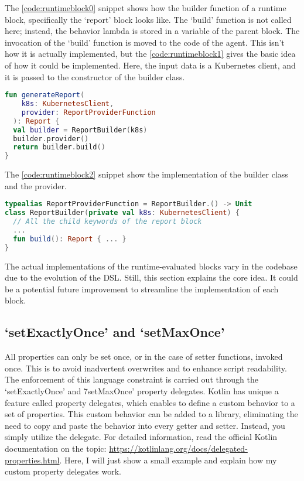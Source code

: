 The \ref{code:runtimeblock0} snippet shows how the builder function of a runtime block, specifically the `report' block looks like. The `build' function is not called here; instead, the behavior lambda is stored in a variable of the parent block. The invocation of the `build' function is moved to the code of the agent. This isn't how it is actually implemented, but the \ref{code:runtimeblock1} gives the basic idea of how it could be implemented. Here, the input data is a Kubernetes client, and it is passed to the constructor of the builder class.

\begin{minipage}{\linewidth}
\begin{lstlisting}[caption={Build a report},language=Kotlin,label=code:runtimeblock1]
fun generateReport(
    k8s: KubernetesClient, 
    provider: ReportProviderFunction
  ): Report {
  val builder = ReportBuilder(k8s)
  builder.provider()
  return builder.build()
}
\end{lstlisting}
\end{minipage}

The \ref{code:runtimeblock2} snippet show the implementation of the builder class and the provider.

\begin{minipage}{\linewidth}
\begin{lstlisting}[caption={Report builder class and provider},language=Kotlin,label=code:runtimeblock2]
typealias ReportProviderFunction = ReportBuilder.() -> Unit
class ReportBuilder(private val k8s: KubernetesClient) {
  // All the child keywords of the report block
  ...
  fun build(): Report { ... }
}
\end{lstlisting}
\end{minipage}

The actual implementations of the runtime-evaluated blocks vary in the codebase due to the evolution of the DSL. Still, this section explains the core idea. It could be a potential future improvement to streamline the implementation of each block.

\subsection{`setExactlyOnce' and `setMaxOnce'}

All properties can only be set once, or in the case of setter functions, invoked once. This is to avoid inadvertent overwrites and to enhance script readability. The enforcement of this language constraint is carried out through the `setExactlyOnce' and 7setMaxOnce' property delegates. Kotlin has unique a feature called property delegates, which enables to define a custom behavior to a set of properties. This custom behavior can be added to a library, eliminating the need to copy and paste the behavior into every getter and setter. Instead, you simply utilize the delegate. For detailed information, read the official Kotlin documentation on the topic: \url{https://kotlinlang.org/docs/delegated-properties.html}. Here, I will just show a small example and explain how my custom property delegates work.

